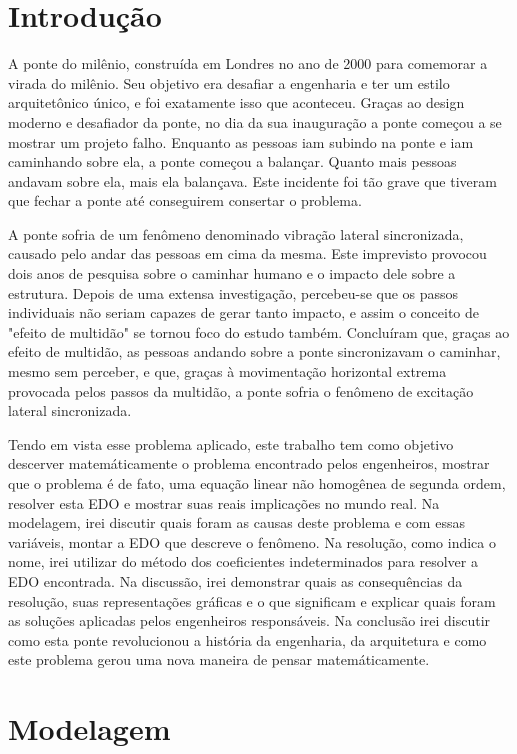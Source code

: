 \documentclass[]{article}
\begin{document}
\section{Introdução}

A ponte do milênio, construída em Londres no ano de 2000 para comemorar
a virada do milênio. Seu objetivo era desafiar a engenharia e ter um estilo arquitetônico único, e foi exatamente isso que aconteceu.
Graças ao design moderno e desafiador da ponte, no dia da sua inauguração a ponte começou a se mostrar um projeto falho.
Enquanto as pessoas iam subindo na ponte e iam caminhando sobre ela, a ponte começou a balançar. Quanto mais pessoas andavam sobre ela,
mais ela balançava. Este incidente foi tão grave que tiveram que fechar a ponte até conseguirem consertar o problema.

A ponte sofria de um fenômeno denominado vibração lateral sincronizada, causado pelo andar das pessoas em cima da mesma.
Este imprevisto provocou dois anos de pesquisa sobre o caminhar humano e o impacto dele sobre a estrutura. 
Depois de uma extensa investigação, percebeu-se que os passos individuais não seriam capazes de gerar tanto impacto, e assim
o conceito de "efeito de multidão" se tornou foco do estudo também. Concluíram que, graças ao efeito de multidão,
as pessoas andando sobre a ponte sincronizavam o caminhar, mesmo sem perceber, e que, graças à movimentação horizontal extrema provocada pelos
passos da multidão, a ponte sofria o fenômeno de excitação lateral sincronizada.

Tendo em vista esse problema aplicado, este trabalho tem como objetivo descerver matemáticamente
o problema encontrado pelos engenheiros, mostrar que o problema é de fato, uma equação linear não 
homogênea de segunda ordem, resolver esta EDO e mostrar suas reais implicações no mundo real.
Na modelagem, irei discutir quais foram as causas deste problema e com essas variáveis, montar a EDO que
descreve o fenômeno. Na resolução, como indica o nome, irei utilizar do método dos coeficientes indeterminados
para resolver a EDO encontrada. Na discussão, irei demonstrar quais as consequências da resolução, suas representações
gráficas e o que significam e explicar quais foram as soluções aplicadas pelos engenheiros responsáveis.
Na conclusão irei discutir como esta ponte revolucionou a história da engenharia, da arquitetura e 
como este problema gerou uma nova maneira de pensar matemáticamente.

\pagebreak 
\section{Modelagem}
\end{document}
